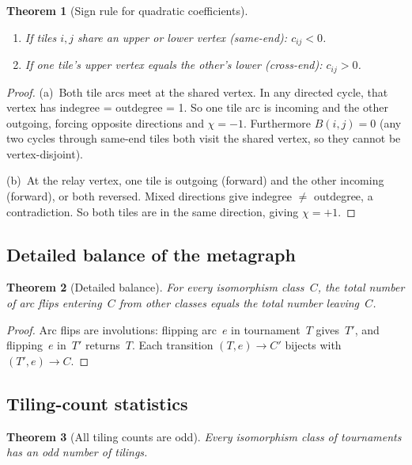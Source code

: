 \documentclass[12pt,reqno]{amsart}
\theoremstyle{plain}
\newtheorem{theorem}{Theorem}[section]
\theoremstyle{definition}
\theoremstyle{remark}
\begin{document}
\begin{theorem}[Sign rule for quadratic coefficients]\label{thm:sign_rule}
\leavevmode
\begin{enumerate}[\upshape(a)]
\item If tiles $i,j$ share an upper or lower vertex (\emph{same-end}): $c_{ij} < 0$.
\item If one tile's upper vertex equals the other's lower (\emph{cross-end}): $c_{ij} > 0$.
\end{enumerate}
\end{theorem}

\begin{proof}
(a)~Both tile arcs meet at the shared vertex. In any directed cycle, that vertex has indegree = outdegree = 1. So one tile arc is incoming and the other outgoing, forcing opposite directions and $\chi = -1$.  Furthermore $B(i,j) = 0$ (any two cycles through same-end tiles both visit the shared vertex, so they cannot be vertex-disjoint).

(b)~At the relay vertex, one tile is outgoing (forward) and the other incoming (forward), or both reversed. Mixed directions give indegree $\neq$ outdegree, a contradiction. So both tiles are in the same direction, giving $\chi = +1$.
\end{proof}

\subsection{Detailed balance of the metagraph}

\begin{theorem}[Detailed balance]\label{thm:detailed_balance}
For every isomorphism class~$C$, the total number of arc flips entering~$C$ from other classes equals the total number leaving~$C$.
\end{theorem}

\begin{proof}
Arc flips are involutions: flipping arc~$e$ in tournament~$T$ gives~$T'$, and flipping~$e$ in~$T'$ returns~$T$. Each transition $(T, e) \to C'$ bijects with $(T', e) \to C$.
\end{proof}

\subsection{Tiling-count statistics}

\begin{theorem}[All tiling counts are odd]\label{thm:odd_tc}
Every isomorphism class of tournaments has an odd number of tilings.
\end{theorem}
\end{document}
